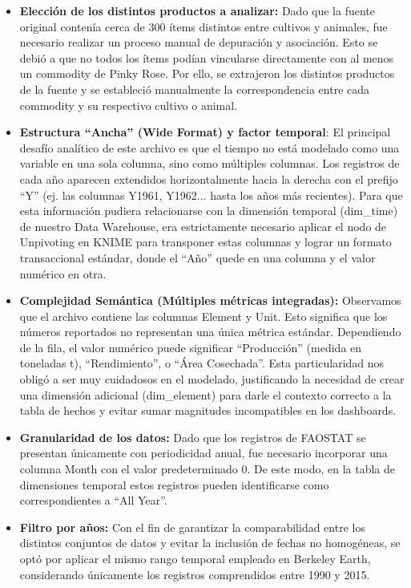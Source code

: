 \begin{itemize}
	\item \textbf{Elección de los distintos productos a analizar: }Dado que la fuente original contenía cerca de 300 ítems distintos entre cultivos y animales, fue necesario realizar un proceso manual de depuración y asociación. Esto se debió a que no todos los ítems podían vincularse directamente con al menos un commodity de Pinky Rose. Por ello, se extrajeron los distintos productos de la fuente y se estableció manualmente la correspondencia entre cada commodity y su respectivo cultivo o animal.
	
	\item \textbf{Estructura ``Ancha'' (Wide Format) y factor temporal}: El principal desafío analítico de este archivo es que el tiempo no está modelado como una variable en una sola columna, sino como múltiples columnas. Los registros de cada año aparecen extendidos horizontalmente hacia la derecha con el prefijo ``Y'' (ej. las columnas Y1961, Y1962... hasta los años más recientes). Para que esta información pudiera relacionarse con la dimensión temporal (dim\_time) de nuestro Data Warehouse, era estrictamente necesario aplicar el nodo de Unpivoting en KNIME para transponer estas columnas y lograr un formato transaccional estándar, donde el ``Año'' quede en una columna y el valor numérico en otra. 
	
	\item \textbf{Complejidad Semántica (Múltiples métricas integradas):} Observamos que el archivo contiene las columnas Element y Unit. Esto significa que los números reportados no representan una única métrica estándar. Dependiendo de la fila, el valor numérico puede significar ``Producción'' (medida en toneladas t), ``Rendimiento'', o ``Área Cosechada''. Esta particularidad nos obligó a ser muy cuidadosos en el modelado, justificando la necesidad de crear una dimensión adicional (dim\_element) para darle el contexto correcto a la tabla de hechos y evitar sumar magnitudes incompatibles en los dashboards. 
	
	\item \textbf{Granularidad de los datos:} Dado que los registros de FAOSTAT se presentan únicamente con periodicidad anual, fue necesario incorporar una columna Month con el valor predeterminado 0. De este modo, en la tabla de dimensiones temporal estos registros pueden identificarse como correspondientes a ``All Year''.
	
	\item \textbf{Filtro por años:} Con el fin de garantizar la comparabilidad entre los distintos conjuntos de datos y evitar la inclusión de fechas no homogéneas, se optó por aplicar el mismo rango temporal empleado en Berkeley Earth, considerando únicamente los registros comprendidos entre 1990 y 2015.
	

\end{itemize}
